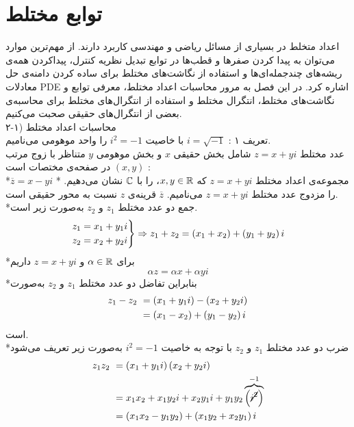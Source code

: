 \part{توابع مختلط}
اعداد متخلط در بسیاری از مسائل ریاضی و مهندسی کاربرد دارند. از مهم‌ترین موارد می‌توان به پیدا کردن صفرها و قطب‌ها در توابع تبدیل نظریه کنترل، پیداکردن همه‌ی ریشه‌های چندجمله‌ای‌ها و استفاده از نگاشت‌های مختلط برای ساده کردن دامنه‌ی حل معادلات PDE اشاره کرد. در این فصل به مرور محاسبات اعداد مختلط، معرفی توابع و نگاشت‌های مختلط، انتگرال مختلط و استفاده از انتگرال‌های مختلط برای محاسبه‌ی بعضی از انتگرال‌های حقیقی صحبت می‌کنیم.\\
۲-۱) محاسبات اعداد مختلط\\
تعریف ۱ :
$i=\sqrt{-1}$
با خاصیت
$i^2=-1$
را واحد موهومی می‌نامیم.\\
عدد مختلط
$z=x+yi$
شامل بخش حقیقی
$x$
و بخش موهومی
$y$
متناظر با زوج مرتب
$(x,y)$
در صفحه‌ی مختصات است :
\\
*مجموعه‌ی اعداد مختلط
$z=x+yi$
که
$x,y\in\mathbb{R}$،
را با
$\mathbb{C}$
نشان می‌دهیم.
*
$\overline{z}=x-yi$
را مزدوج عدد مختلط
$z=x+yi$
می‌نامیم.
$\overline{z}$
قرینه‌ی
$z$
نسبت به محور حقیقی است.
\\
*جمع دو عدد مختلط
$z_1$
و
$z_2$
به‌صورت زیر است.
\begin{equation*}
	\begin{rcases}
		z_1=x_1+y_1i
		\\
		z_2=x_2+y_2i
	\end{rcases}
	\Rightarrow
	z_1+z_2=\left(x_1+x_2\right)+\left(y_1+y_2\right)i
\end{equation*}
*برای
$\alpha\in\mathbb{R}$
و
$z=x+yi$
داریم
$$\alpha z=\alpha x+\alpha y i$$
*بنابراین تفاضل دو عدد مختلط
$z_1$
و
$z_2$
به‌صورت
\begin{equation*}
	\begin{aligned}
		z_1-z_2&\ =\left(x_1+y_1i\right)-\left(x_2+y_2i\right)
		\\ &\
		=\left(x_1-x_2\right)+\left(y_1-y_2\right)i
	\end{aligned}
\end{equation*}
است.\\
*ضرب دو عدد مختلط
$z_1$
و
$z_2$
با توجه به خاصیت
$i^2=-1$
به‌صورت زیر تعریف می‌شود
\begin{equation*}
	\begin{aligned}
		z_1z_2&\ =\left(x_1+y_1i\right)\left(x_2+y_2i\right)
		\\ &\
		=x_1x_2+x_1y_2i+x_2y_1i+y_1y_2\overbrace{\left(\cancel{i^2}\right)}^{-1}
		\\ &\
		=\left(x_1x_2-y_1y_2\right)+\left(x_1y_2+x_2y_1\right)i
	\end{aligned}
\end{equation*}

